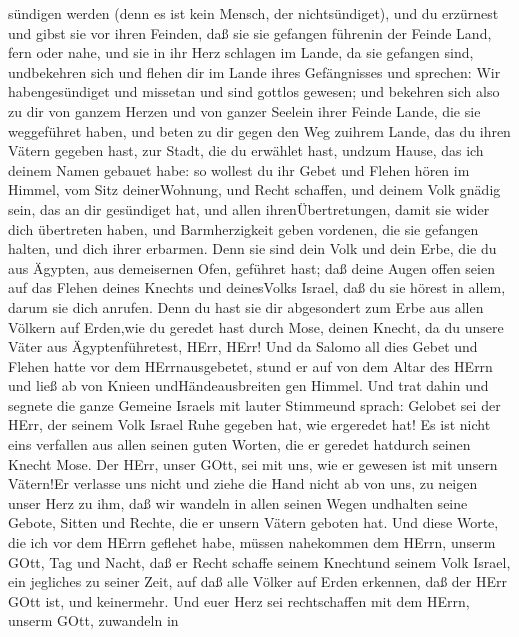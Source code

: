 sündigen werden (denn es ist kein Mensch, der nichtsündiget), und du
erzürnest und gibst sie vor ihren Feinden, daß sie sie gefangen führenin
der Feinde Land, fern oder nahe,  und sie in ihr Herz
schlagen im Lande, da sie gefangen sind, undbekehren sich und flehen dir
im Lande ihres Gefängnisses und sprechen: Wir habengesündiget und
missetan und sind gottlos gewesen;  und bekehren sich also
zu dir von ganzem Herzen und von ganzer Seelein ihrer Feinde Lande, die
sie weggeführet haben, und beten zu dir gegen den Weg zuihrem Lande, das
du ihren Vätern gegeben hast, zur Stadt, die du erwählet hast, undzum
Hause, das ich deinem Namen gebauet habe:  so wollest du
ihr Gebet und Flehen hören im Himmel, vom Sitz deinerWohnung, und Recht
schaffen,  und deinem Volk gnädig sein, das an dir
gesündiget hat, und allen ihrenÜbertretungen, damit sie wider dich
übertreten haben, und Barmherzigkeit geben vordenen, die sie gefangen
halten, und dich ihrer erbarmen.  Denn sie sind dein Volk
und dein Erbe, die du aus Ägypten, aus demeisernen Ofen, geführet hast;
 daß deine Augen offen seien auf das Flehen deines Knechts
und deinesVolks Israel, daß du sie hörest in allem, darum sie dich
anrufen.  Denn du hast sie dir abgesondert zum Erbe aus
allen Völkern auf Erden,wie du geredet hast durch Mose, deinen Knecht,
da du unsere Väter aus Ägyptenführetest, HErr, HErr!  Und
da Salomo all dies Gebet und Flehen hatte vor dem HErrnausgebetet, stund
er auf von dem Altar des HErrn und ließ ab von Knieen undHändeausbreiten
gen Himmel.  Und trat dahin und segnete die ganze Gemeine
Israels mit lauter Stimmeund sprach:  Gelobet sei der HErr,
der seinem Volk Israel Ruhe gegeben hat, wie ergeredet hat! Es ist nicht
eins verfallen aus allen seinen guten Worten, die er geredet hatdurch
seinen Knecht Mose.  Der HErr, unser GOtt, sei mit uns, wie
er gewesen ist mit unsern Vätern!Er verlasse uns nicht und ziehe die
Hand nicht ab von uns,  zu neigen unser Herz zu ihm, daß
wir wandeln in allen seinen Wegen undhalten seine Gebote, Sitten und
Rechte, die er unsern Vätern geboten hat.  Und diese Worte,
die ich vor dem HErrn geflehet habe, müssen nahekommen dem HErrn, unserm
GOtt, Tag und Nacht, daß er Recht schaffe seinem Knechtund seinem Volk
Israel, ein jegliches zu seiner Zeit,  auf daß alle Völker
auf Erden erkennen, daß der HErr GOtt ist, und keinermehr. 
Und euer Herz sei rechtschaffen mit dem HErrn, unserm GOtt, zuwandeln in
